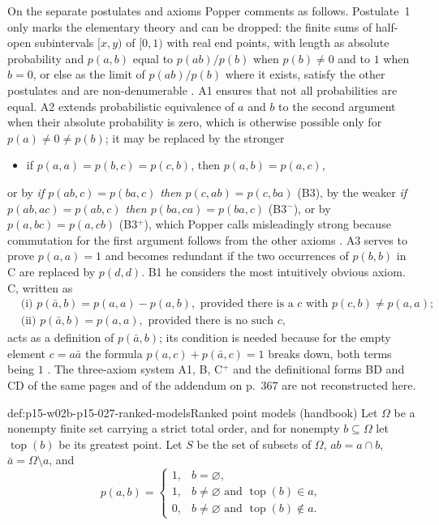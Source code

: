 On the separate postulates and axioms Popper comments as follows.
Postulate~1 only marks the elementary theory and can be dropped: the
finite sums of half-open subintervals \([x,y)\) of \([0,1)\) with real
end points, with length as absolute probability and \(p(a,b)\) equal to
\(p(ab)/p(b)\) when \(p(b)\neq0\) and to \(1\) when \(b=0\), or else as the limit of \(p(ab)/p(b)\) where it exists, satisfy the
other postulates and are non-denumerable \parencite[appendix~*iv,
p.~339]{Popper2002LogicDiscoveryUI}. A1 ensures that not all
probabilities are equal. A2 extends probabilistic equivalence of \(a\) and
\(b\) to the second argument when their absolute probability is zero,
which is otherwise possible only for \(p(a)\neq0\neq p(b)\); it may be
replaced by the stronger
\begin{itemize}
\item[A2\({}^{+}\)] if \(p(a,a)=p(b,c)=p(c,b)\), then \(p(a,b)=p(a,c)\),
\end{itemize}
or by \emph{if \(p(ab,c)=p(ba,c)\) then \(p(c,ab)=p(c,ba)\)} (B3), by the
weaker \emph{if \(p(ab,ac)=p(ab,c)\) then \(p(ba,ca)=p(ba,c)\)}
(B3\({}^{-}\)), or by \(p(a,bc)=p(a,cb)\) (B3\({}^{+}\)), which Popper
calls misleadingly strong because commutation for the first argument
follows from the other axioms \parencite[appendix~*iv,
p.~340]{Popper2002LogicDiscoveryUI}. A3 serves to prove \(p(a,a)=1\) and
becomes redundant if the two occurrences of \(p(b,b)\) in C are replaced
by \(p(d,d)\). B1 he considers the most intuitively obvious axiom. C,
written as
\[
\begin{aligned}
 &\text{(i) } p(\bar a,b)=p(a,a)-p(a,b),\text{ provided there is a \(c\) with }p(c,b)\neq p(a,a);\\
 &\text{(ii) } p(\bar a,b)=p(a,a),\text{ provided there is no such \(c\)},
\end{aligned}
\]
acts as a definition of \(p(\bar a,b)\); its condition is needed because
for the empty element \(c=a\bar a\) the formula
\(p(a,c)+p(\bar a,c)=1\) breaks down, both terms being \(1\)
\parencite[appendix~*iv, pp.~341--342]{Popper2002LogicDiscoveryUI}.
The three-axiom system A1, B, C\({}^{+}\) and the definitional forms BD
and CD of the same pages and of the addendum on p.~367 are not
reconstructed here.

\begin{hbdefinition}{def:p15-w02b-p15-027-ranked-models}{Ranked point models (handbook)}
Let \(\Omega\) be a nonempty finite set carrying a strict total order,
and for nonempty \(b\subseteq\Omega\) let \(\operatorname{top}(b)\) be its
greatest point. Let \(S\) be the set of subsets of \(\Omega\), \(ab=a\cap
b\), \(\bar a=\Omega\setminus a\), and
\[
 p(a,b)=\begin{cases}1,& b=\varnothing,\\
 1,& b\neq\varnothing\text{ and }\operatorname{top}(b)\in a,\\
 0,& b\neq\varnothing\text{ and }\operatorname{top}(b)\notin a.\end{cases}
\]
\end{hbdefinition}

